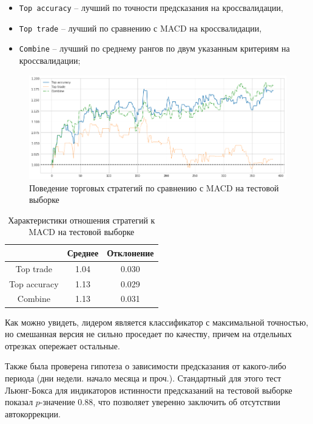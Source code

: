 \documentclass[pdftex,ptm,14pt,a4paper]{extreport}
\begin{document}
\begin{itemize}
\item \texttt{Top accuracy} -- лучший по точности предсказания на кроссвалидации,
\item \texttt{Top trade} -- лучший по сравнению с MACD на кроссвалидации,
\item \texttt{Combine} -- лучший по среднему рангов по двум указанным критериям на кроссвалидации;
\end{itemize}

\begin{figure}
\includegraphics[width=\linewidth]{vs_macd_on_test}
\caption{Поведение торговых стратегий по сравнению с MACD на тестовой выборке \label{fig:vs_macd_on_test}}
\end{figure}

\begin{table}
\centering 
\begin{tabular}{| c | c | c |}
\hline
 & Среднее & Отклонение \\ \hline
Top trade & 1.04 & 0.030 \\ \hline
Top accuracy & 1.13 & 0.029 \\ \hline
Combine & 1.13 & 0.031 \\ \hline
\end{tabular}
\caption{Характеристики отношения стратегий к MACD на тестовой выборке\label{test_table_compare}}
\end{table}

Как можно увидеть, лидером является классификатор с максимальной точностью, но смешанная версия не сильно проседает по качеству,
причем на отдельных отрезках опережает остальные.

Также была проверена гипотеза о зависимости предсказания от какого-либо периода (дни недели. начало месяца и проч.).
Стандартный для этого тест Льюнг-Бокса\cite{ljungbox} для индикаторов истинности предсказаний на тестовой выборке
показал $p$-значение 0.88, что позволяет уверенно заключить об отсутствии автокоррекции.
\end{document}
